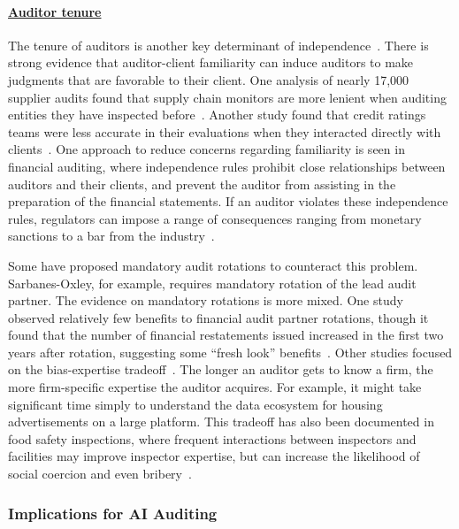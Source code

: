 \documentclass[sigconf]{acmart}
\begin{document}
\paragraph{\underline{Auditor tenure}} The tenure of auditors is another key determinant of independence~\cite{church2015auditor}. There is strong evidence that auditor-client familiarity can induce auditors to make judgments that are favorable to their client. One analysis of nearly 17,000 supplier audits found that supply chain monitors are more lenient when auditing entities they have inspected before~\cite{short2016monitoring}. Another study found that credit ratings teams were less accurate in their evaluations when they interacted directly with clients~\cite{griffin2011did}. One approach to reduce concerns regarding familiarity is seen in financial auditing, where independence rules prohibit close relationships between auditors and their clients, and prevent the auditor from assisting in the preparation of the financial statements. If an auditor violates these independence rules, regulators can impose a range of consequences ranging from monetary sanctions to a bar from the industry~\cite{sec_leg}.

Some have proposed mandatory audit rotations to counteract this problem. Sarbanes-Oxley, for example, requires mandatory rotation of the lead audit partner. The evidence on mandatory rotations is more mixed. One study observed relatively few benefits to financial audit partner rotations, though it found that the number of financial restatements issued increased in the first two years after rotation, suggesting some “fresh look” benefits~\cite{gipper2021economics}. Other studies focused on the bias-expertise tradeoff~\cite{porter2012complaint,kim2015mandatory,ewelt2012we,houghton2003market,harber2020perceived}. The longer an auditor gets to know a firm, the more firm-specific expertise the auditor acquires. For example, it might take significant time simply to understand the data ecosystem for housing advertisements on a large platform. This tradeoff has also been documented in food safety inspections, where frequent interactions between inspectors and facilities may improve inspector expertise, but can increase the likelihood of social coercion and even bribery~\cite{schuck1972curious,kovacs2020grade}. 

\subsubsection{Implications for AI Auditing}
\end{document}
